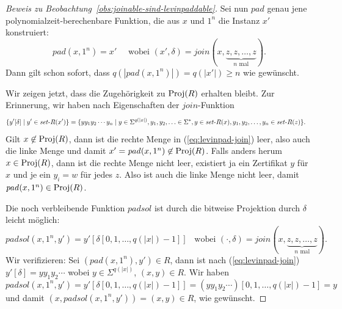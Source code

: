 \begin{proof}[Beweis zu Beobachtung~\ref{obs:joinable-sind-levinpaddable}]
    Sei nun $\mathit{pad}$ genau jene polynomialzeit-berechenbare Funktion, die aus $x$ und $1^n$ die Instanz $x'$ konstruiert:
    \[ \mathit{pad}(x, 1^n) = x' \quad\text{ wobei }
    (x',\delta)=\mathit{join}(x, \underbrace{z,z,\ldots, z}_{\text{$n$ mal}}).\]
    Dann gilt schon sofort, dass $q(|\mathit{pad}(x, 1^n)|)=q(|x'|)\geq n$ wie gewünscht.

    Wir zeigen jetzt, dass die Zugehörigkeit zu $\operatorname{Proj}(R)$ erhalten bleibt.
    Zur Erinnerung, wir haben nach Eigenschaften der $\mathit{join}$-Funktion
    \begin{align}\label{eq:levinpad-join} &\{ y'[\delta] \mid y'\in\mathit{set}\text{-}{}R(x') \} = \{ yy_1y_2\cdots y_{n} \mid y\in\Sigma^{q(|x|)}, y_1,y_2, \ldots \in \Sigma^*, y\in\mathit{set}\text{-}{}R(x), y_1,y_2,\dots,y_n\in\mathit{set}\text{-}{}R(z) \}. \end{align}
    Gilt $x\not\in\operatorname{Proj}(R)$, dann ist die rechte Menge in (\ref{eq:levinpad-join}) leer, also auch die linke Menge und damit $x'=\mathit{pad}(x, 1^n)\not\in \operatorname{Proj}(R)$.
    Falls anders herum $x\in\operatorname{Proj}(R)$, dann ist die rechte Menge nicht leer, existiert ja ein Zertifikat $y$ für $x$ und je ein $y_i=w$ für jedes $z$. Also ist auch die linke Menge nicht leer, damit $\mathit{pad}(x, 1^n)\in \operatorname{Proj}(R)$.

    Die noch verbleibende Funktion $\mathit{padsol}$ ist durch die bitweise Projektion durch $\delta$ leicht möglich:
    \[
        \mathit{padsol}(x, 1^n, y') = y'[\delta[0, 1, \ldots, q(|x|)-1]] \enspace\text{ wobei } (\cdot, \delta) = \mathit{join}(x, \underbrace{z,z,\ldots, z}_{\text{$n$ mal}}).\]
    Wir verifizieren: Sei $(\mathit{pad}(x, 1^n), y')\in R$, dann ist nach (\ref{eq:levinpad-join}) $y'[\delta]=yy_1y_2\cdots$ wobei $y\in\Sigma^{q(|x|)}$, $(x, y)\in R$. 
    Wir haben
    \[ \mathit{padsol}(x, 1^n, y') = y'[\delta[0, 1, \ldots, q(|x|)-1]] = (yy_1y_2\cdots)[0,1,\ldots,q(|x|)-1] = y \]
    und damit $(x, \mathit{padsol}(x, 1^n, y')) = (x, y)\in R$, wie gewünscht.
\end{proof}

